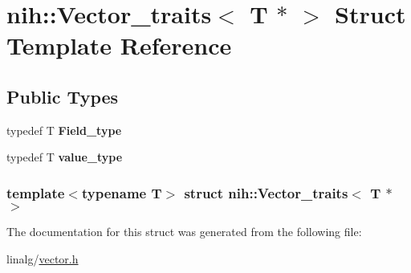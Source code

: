 \hypertarget{structnih_1_1_vector__traits_3_01_t_01_5_01_4}{
\section{nih\-:\-:\-Vector\-\_\-traits$<$ \-T $\ast$ $>$ \-Struct \-Template \-Reference}
\label{structnih_1_1_vector__traits_3_01_t_01_5_01_4}
}
\subsection*{\-Public \-Types}
\begin{DoxyCompactItemize}
\item 
\hypertarget{structnih_1_1_vector__traits_3_01_t_01_5_01_4_a6bfe1eea5ed32e84e1d30ef20ccc82f6}{
typedef \-T {\bfseries \-Field\-\_\-type}}
\label{structnih_1_1_vector__traits_3_01_t_01_5_01_4_a6bfe1eea5ed32e84e1d30ef20ccc82f6}

\item 
\hypertarget{structnih_1_1_vector__traits_3_01_t_01_5_01_4_a8dfbeedbcfe6ce8886e4cbd0ecb14772}{
typedef \-T {\bfseries value\-\_\-type}}
\label{structnih_1_1_vector__traits_3_01_t_01_5_01_4_a8dfbeedbcfe6ce8886e4cbd0ecb14772}

\end{DoxyCompactItemize}
\subsubsection*{template$<$typename T$>$ struct nih\-::\-Vector\-\_\-traits$<$ T $\ast$ $>$}



\-The documentation for this struct was generated from the following file\-:\begin{DoxyCompactItemize}
\item 
linalg/\hyperlink{vector_8h}{vector.\-h}\end{DoxyCompactItemize}
